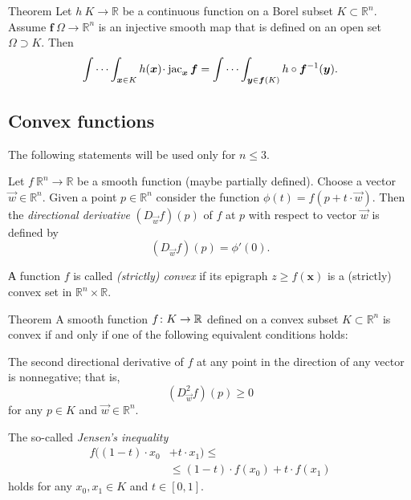 \begin{multicols}{2}
{\begin{thm}{Theorem}\label{thm:mult-substitution} 
Let $h\:K\to\mathbb{R}$ be a continuous function on a Borel subset $K\subset \mathbb{R}^n$.
Assume $\bm{f}\:\Omega\to \mathbb{R}^n$ is an injective smooth map that is defined on an open set $\Omega\supset K$.
Then 
\[\idotsint_{\bm{x}\in K} h(\bm{x})\cdot \jac_{\bm{x}}\bm{f}
=
\idotsint_{\bm{y}\in \bm{f}(K)} h\circ \bm{f}^{-1}(\bm{y}).\]

\end{thm}

\subsection*{Convex functions}

The following statements will be used only for $n\le 3$.

Let $f\:\mathbb{R}^n\to \mathbb{R}$ be a smooth function (maybe partially defined).
Choose a vector $\vec w\in \mathbb{R}^n$.
Given a point $p\in\mathbb{R}^n$ consider the function $\phi(t)=f(p+t\cdot \vec w)$.
Then the \emph{directional derivative} $(D_{\vec w}f)(p)$ of $f$ at $p$ with respect to vector $\vec w$ is defined by
\[(D_{\vec w}f)(p)=\phi'(0).\]

А function $f$ is called \emph{(strictly) convex} if 
its epigraph $z\ge f(\bm{x})$ is a (strictly) convex set in $\mathbb{R}^n\times \mathbb{R}$.

\begin{thm}{Theorem}\label{thm:Jensen}
A smooth function $f\:K\z\to \mathbb{R}$ defined on a convex subset $K\subset\mathbb{R}^n$ is convex if and only if one of the following equivalent conditions holds:

\begin{subthm}{}
The second directional derivative of $f$ at any point in the direction of any vector is nonnegative; that is,
\[(D_{\vec w}^2f)(p)\ge 0\]
for any $p\in K$ and $\vec w\in\mathbb{R}^n$.
\end{subthm}

\begin{subthm}{}
The so-called \emph{Jensen's inequality}
\begin{align*}
f ((1-t)\cdot x_0 &+ t\cdot x_1 ) \le
\\
&\le (1-t)\cdot f(x_0)+ t\cdot f(x_1)
\end{align*}
holds for any $x_0,x_1\in K$ and $t\in[0,1]$.

\end{subthm}


\end{thm}}
\end{multicols}
